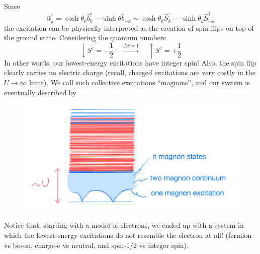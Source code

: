 Since
\[ \hat{\alpha}_{k}^{\dagger}=\cosh \theta _k\hat{b}_{k}^{\dagger}-\sinh \theta \hat{b}_{-k}\sim \cosh \theta _k\hat{S}_{k}^{-}-\sinh \theta _k\hat{S}_{-k}^{\dagger}\]
the excitation can be physically interpreted as the creation of spin flips on top of the ground state. Considering the quantum numbers
\[ \downarrow S^z=-\frac{1}{2}\quad \stackrel{\Delta S=1}{\rightarrow} \quad \uparrow S^z=+\frac{1}{2}\]
In other words, our lowest-energy excitations have integer spin! Also, the spin flip clearly carries no electric charge (recall, charged excitations are very costly in the $U\to \infty$ limit). We call such collective excitations ``magnons'', and our system is eventually described by
\begin{figure}[H]
    \centering
    \includegraphics[width=\textwidth]{jupyterbook/data/fig/lec25-fig07.png}
\end{figure}
Notice that, starting with a model of electrons, we ended up with a system in which the lowest-energy excitations do not resemble the electron at all! (fermion vs boson, charge-e vs neutral, and spin-1/2 vs integer spin).
